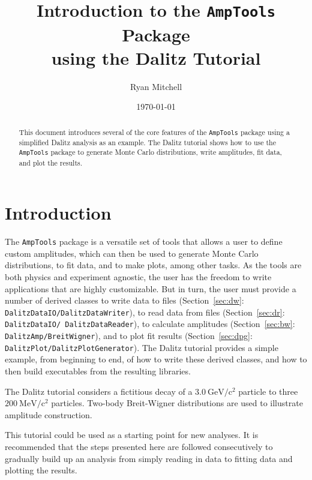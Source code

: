 \documentclass[11pt]{article}
\newcommand{\gevcc}{\mathrm{GeV/c^2}}
\newcommand{\mevcc}{\mathrm{MeV/c^2}}
\begin{document}
\title{Introduction to the {\tt AmpTools} Package\\ using the Dalitz Tutorial}
\author{Ryan Mitchell}
\date{\today}
\maketitle 

\begin{abstract}
This document introduces several of the core features of the {\tt AmpTools} package using a simplified Dalitz analysis as an example.  The Dalitz tutorial shows how to use the {\tt AmpTools} package to generate Monte Carlo distributions, write amplitudes, fit data, and plot the results.
\end{abstract}


\tableofcontents

\parindent 0pt
\parskip 10pt


\section{Introduction}

The {\tt AmpTools} package is a versatile set of tools that allows a user to define custom amplitudes, which can then be used to generate Monte Carlo distributions, to fit data, and to make plots, among other tasks.  As the tools are both physics and experiment agnostic, the user has the freedom to write applications that are highly customizable.  But in turn, the user must provide a number of derived classes to write data to files (Section~\ref{sec:dw}: {\tt DalitzDataIO/DalitzDataWriter}), to read data from files (Section~\ref{sec:dr}: {\tt DalitzDataIO/ DalitzDataReader}), to calculate amplitudes (Section~\ref{sec:bw}: {\tt DalitzAmp/BreitWigner}), and to plot fit results (Section~\ref{sec:dpg}: {\tt DalitzPlot/DalitzPlotGenerator}).  The Dalitz tutorial provides a simple example, from beginning to end, of how to write these derived classes, and how to then build executables from the resulting libraries.

The Dalitz tutorial considers a fictitious decay of a $3.0~\gevcc$ particle to three $200~\mevcc$ particles.  Two-body Breit-Wigner distributions are used to illustrate amplitude construction.

This tutorial could be used as a starting point for new analyses.  It is recommended that the steps presented here are followed consecutively to gradually build up an analysis from simply reading in data to fitting data and plotting the results.
\end{document}
